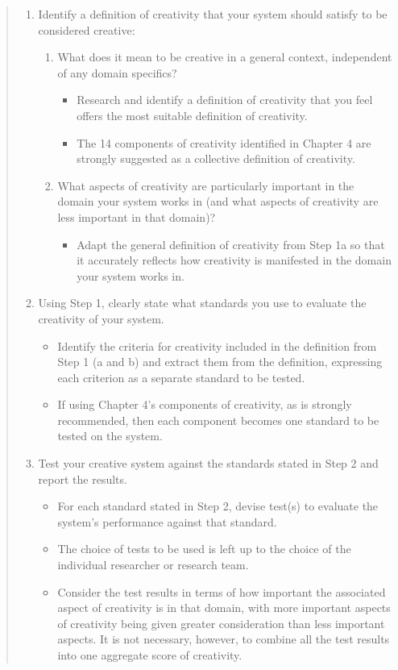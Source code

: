 \begin{quotation}
  \begin{enumerate}
    \item Identify a definition of creativity that your system should satisfy to be considered creative:
      \begin{enumerate}
        \item What does it mean to be creative in a general context, independent of any domain specifics?
        \begin{itemize}
          \item Research and identify a definition of creativity that you feel offers the most suitable definition of creativity.
          \item The 14 components of creativity identified in Chapter 4 are strongly suggested as a collective definition of creativity.
        \end{itemize}
        \item What aspects of creativity are particularly important in the domain your system works in (and what aspects of creativity are less important in that domain)?
        \begin{itemize}
          \item Adapt the general definition of creativity from Step 1a so that it accurately reflects how creativity is manifested in the domain your system works in.
        \end{itemize}
      \end{enumerate}
    \item Using Step 1, clearly state what standards you use to evaluate the creativity of your system.
      \begin{itemize}
        \item Identify the criteria for creativity included in the definition from Step 1 (a and b) and extract them from the definition, expressing each criterion as a separate standard to be tested.
        \item If using Chapter 4's components of creativity, as is strongly recommended, then each component becomes one standard to be tested on the system.
      \end{itemize}
    \item Test your creative system against the standards stated in Step 2 and report the results.
      \begin{itemize}
        \item For each standard stated in Step 2, devise test(s) to evaluate the system's performance against that standard.
        \item The choice of tests to be used is left up to the choice of the individual researcher or research team.
        \item Consider the test results in terms of how important the associated aspect of creativity is in that domain, with more important aspects of creativity being given greater consideration than less important aspects. It is not necessary, however, to combine all the test results into one aggregate score of creativity.
      \end{itemize}
  \end{enumerate}
\end{quotation}

